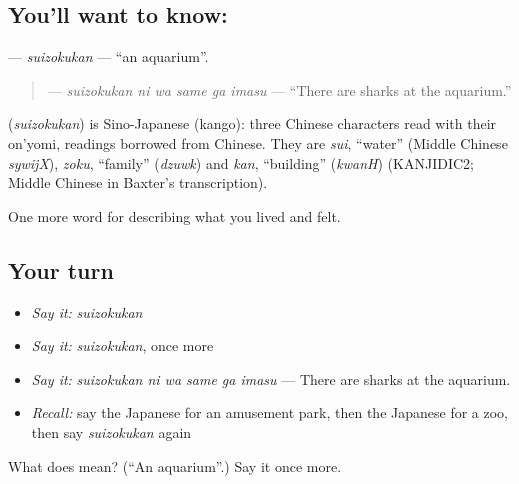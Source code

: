 \subsection*{You'll want to know: }
\textbf{} — \emph{suizokukan} — \textquotedblleft{}an aquarium\textquotedblright{}.

\begin{quote}
\textbf{  } — \emph{suizokukan ni wa same ga imasu} — \textquotedblleft{}There are sharks at the aquarium.\textquotedblright{}
\end{quote}

\begin{cousinweb}
\textbf{} (\emph{suizokukan}) is Sino-Japanese (kango): three Chinese characters read with their on'yomi, readings borrowed from Chinese. They are \emph{sui}, \textquotedblleft{}water\textquotedblright{} (Middle Chinese \emph{sywijX}), \emph{zoku}, \textquotedblleft{}family\textquotedblright{} (\emph{dzuwk}) and \emph{kan}, \textquotedblleft{}building\textquotedblright{} (\emph{kwanH}) (KANJIDIC2; Middle Chinese in Baxter's transcription).
\end{cousinweb}

\begin{grammarlens}[title={What you've built}]
One more word for describing what you lived and felt.
\end{grammarlens}

\subsection*{Your turn}
\begin{itemize}
\raggedright
  \item \emph{Say it:} \emph{suizokukan}
  \item \emph{Say it:} \emph{suizokukan}, once more
  \item \emph{Say it:} \emph{suizokukan ni wa same ga imasu} — There are sharks at the aquarium.
  \item \emph{Recall:} say the Japanese for an amusement park, then the Japanese for a zoo, then say \emph{suizokukan} again
\end{itemize}

\begin{tcolorbox}[breakable,colback=teal!4,colframe=teal!35!black,title={Before you move on}]
What does  mean? (\textquotedblleft{}An aquarium\textquotedblright{}.) Say it once more.
\end{tcolorbox}
